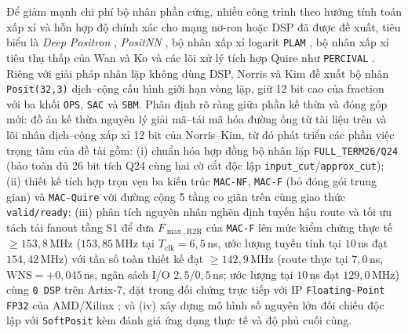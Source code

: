 Để giảm mạnh chi phí bộ nhân phần cứng, nhiều công trình theo hướng tính toán xấp xỉ
và hỗn hợp độ chính xác cho mạng nơ-ron hoặc DSP đã được đề xuất, tiêu biểu là
\textit{Deep Positron} \cite{carmichael2019deep}, \textit{PositNN}
\cite{langroudi2019positnn}, bộ nhân xấp xỉ logarit \texttt{PLAM}
\cite{murillo2021plam}, bộ nhân xấp xỉ tiêu thụ thấp của Wan và Ko
\cite{wan2023lowcost} và các lõi xử lý tích hợp Quire như \texttt{PERCIVAL}
\cite{mallasen2022percival,mallasen2024bigposit}. Riêng với giải pháp nhân lặp
không dùng DSP, Norris và Kim \cite{norris2021iterativeposit} đề xuất bộ nhân
\texttt{Posit(32,3)} dịch--cộng cấu hình giới hạn vòng lặp, giữ 12 bit cao của
fraction với ba khối \texttt{OPS}, \texttt{SAC} và \texttt{SBM}. Phân định rõ ràng
giữa phần kế thừa và đóng góp mới: đồ án kế thừa nguyên lý giải mã--tái mã
hóa đường ống từ tài liệu trên và lõi nhân dịch--cộng xấp xỉ 12 bit của Norris--Kim,
từ đó phát triển các phần việc trọng tâm của đề tài gồm: (i) chuẩn hóa hợp đồng
bộ nhân lặp \texttt{FULL\_TERM26/Q24} (bảo toàn đủ 26 bit tích Q24 cùng hai cờ
cắt độc lập \texttt{input\_cut}/\texttt{approx\_cut}); (ii) thiết kế tích hợp trọn
vẹn ba kiến trúc \texttt{MAC-NF}, \texttt{MAC-F} (bỏ đóng gói trung gian) và
\texttt{MAC-Quire} với đường cộng 5 tầng co giãn trên cùng giao thức
\texttt{valid/ready}; (iii) phân tích nguyên nhân nghẽn định tuyến hậu route và
tối ưu tách tải fanout tầng S1 để đưa $F_{\max,\mathrm{R2R}}$ của \texttt{MAC-F}
lên mức kiểm chứng thực tế $\ge 153{,}8$\,MHz ($153{,}85$\,MHz tại $T_{\mathrm{clk}}=6{,}5$\,ns,
ước lượng tuyến tính tại $10$\,ns đạt $154{,}42$\,MHz) với tần số toàn thiết kế
đạt $\ge 142{,}9$\,MHz (route thực tại $7{,}0$\,ns, $\mathrm{WNS}=+0{,}045$\,ns,
ngân sách I/O $2{,}5/0{,}5$\,ns; ước lượng tại $10$\,ns đạt $129{,}0$\,MHz) cùng \texttt{0 DSP} trên Artix-7, đặt trong đối chứng trực tiếp với IP \texttt{Floating-Point FP32} của AMD/Xilinx
\cite{amd_pg060_fp,amd_ug906_timing}; và (iv) xây dựng mô hình số nguyên lớn đối
chiếu độc lập với \texttt{SoftPosit} kèm đánh giá ứng dụng thực tế và độ phủ cuối cùng.


